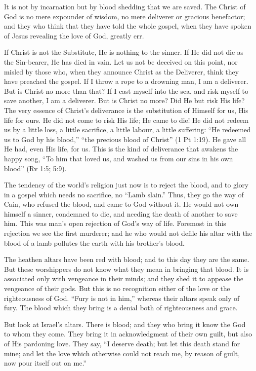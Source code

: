 \documentclass[
]{book}
\begin{document}
It is not by incarnation but by blood shedding that we are saved. The Christ of God is no mere expounder of wisdom, no mere deliverer or gracious benefactor; and they who think that they have told the whole gospel, when they have spoken of Jesus revealing the love of God, greatly err.

If Christ is not the Substitute, He is nothing to the sinner. If He did not die as the Sin-bearer, He has died in vain. Let us not be deceived on this point, nor misled by those who, when they announce Christ as the Deliverer, think they have preached the gospel. If I throw a rope to a drowning man, I am a deliverer. But is Christ no more than that? If I cast myself into the sea, and risk myself to save another, I am a deliverer. But is Christ no more? Did He but risk His life? The very essence of Christ's deliverance is the substitution of Himself for us, His life for ours. He did not come to risk His life; He came to die! He did not redeem us by a little loss, a little sacrifice, a little labour, a little suffering: ``He redeemed us to God by his blood,'' ``the precious blood of Christ'' (1 Pt 1:19). He gave all He had, even His life, for us. This is the kind of deliverance that awakens the happy song, ``To him that loved us, and washed us from our sins in his own blood'' (Rv 1:5; 5:9).

The tendency of the world's religion just now is to reject the blood, and to glory in a gospel which needs no sacrifice, no ``Lamb slain.'' Thus, they go the way of Cain, who refused the blood, and came to God without it. He would not own himself a sinner, condemned to die, and needing the death of another to save him. This was man's open rejection of God's way of life. Foremost in this rejection we see the first murderer; and he who would not defile his altar with the blood of a lamb pollutes the earth with his brother's blood.

The heathen altars have been red with blood; and to this day they are the same. But these worshippers do not know what they mean in bringing that blood. It is associated only with vengeance in their minds; and they shed it to appease the vengeance of their gods. But this is no recognition either of the love or the righteousness of God. ``Fury is not in him,'' whereas their altars speak only of fury. The blood which they bring is a denial both of righteousness and grace.

But look at Israel's altars. There is blood; and they who bring it know the God to whom they come. They bring it in acknowledgment of their own guilt, but also of His pardoning love. They say, ``I deserve death; but let this death stand for mine; and let the love which otherwise could not reach me, by reason of guilt, now pour itself out on me.''
\end{document}
